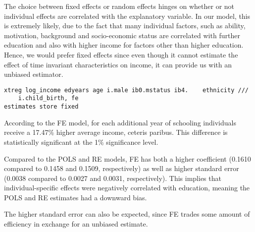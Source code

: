 


The choice between fixed effects or random effects hinges on whether or not individual effects are correlated with the explanatory variable. In our model, this is extremely likely, due to the fact that many individual factors, such as ability, motivation, background and socio-economic status are correlated with further education and also with higher income for factors other than higher education. Hence, we would prefer fixed effects since even though it cannot estimate the effect of time invariant characteristics on income, it can provide us with an unbiased estimator.


\begin{verbatim}
xtreg log_income edyears age i.male ib0.mstatus ib4.    ethnicity ///
    i.child_birth, fe
estimates store fixed
\end{verbatim}


According to the FE model, for each additional year of schooling individuals receive a 17.47\% higher average income, ceteris paribus. This difference is statistically significant at the 1\% significance level.

Compared to the POLS and RE models, FE has both a higher coefficient (0.1610 compared to 0.1458 and 0.1509, respectively) as well as higher standard error (0.0038 compared to 0.0027 and 0.0031, respectively). This implies that individual-specific effects were negatively correlated with education, meaning the POLS and RE estimates had a downward bias.

The higher standard error can also be expected, since FE trades some amount of efficiency in exchange for an unbiased estimate.

